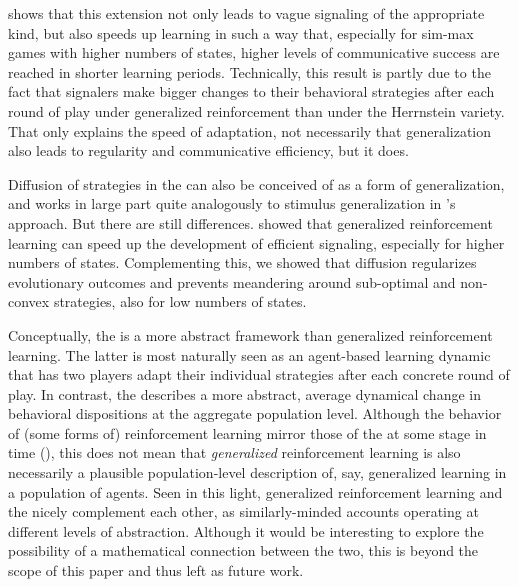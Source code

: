 \documentclass[fleqn,reqno,10pt]{article}
\newcommand{\rd}{\acro{rd}} %
\newcommand{\rdd}{\acro{rdd}} %
\begin{document}
\citet{OConnor2013:The-Evolution-o} shows that this extension not only
leads to vague signaling of the appropriate kind, but also speeds up
learning in such a way that, especially for sim-max games with higher
numbers of states, higher levels of communicative success are reached
in shorter learning periods. Technically, this result is partly due to
the fact that signalers make bigger changes to their behavioral
strategies after each round of play under generalized reinforcement
than under the Herrnstein variety. That only explains the speed of
adaptation, not necessarily that generalization also leads to
regularity and communicative efficiency, but it does.

Diffusion of strategies in the \rdd can also be conceived of as a form
of generalization, and works in large part quite analogously to stimulus
generalization in \citeauthor{OConnor2013:The-Evolution-o}'s
approach. But there are still
differences. \citeauthor{OConnor2013:The-Evolution-o} showed that
generalized reinforcement learning can speed up the development of
efficient signaling, especially for higher numbers of
states. Complementing this, we showed that diffusion regularizes
evolutionary outcomes and prevents meandering around sub-optimal and
non-convex strategies, also for low numbers of states.

Conceptually, the \rdd is a more abstract framework than generalized
reinforcement learning. The latter is most naturally seen as an
agent-based learning dynamic that has two players adapt their
individual strategies after each concrete round of play. In contrast,
the \rdd describes a more abstract, average dynamical change in
behavioral dispositions at the aggregate population level. Although
the behavior of (some forms of) reinforcement learning mirror those of
the \rd at some stage in time
(\cite{BorgersSarin997:Learning-Throug,HopkinsPosch2005:Attainability-o,Beggs2005:On-the-Converge}),
this does not mean that \emph{generalized} reinforcement learning is
also necessarily a plausible population-level description of, say,
generalized learning in a population of agents. Seen in this light,
generalized reinforcement learning and the \rdd nicely complement each
other, as similarly-minded accounts operating at different levels of
abstraction.
Although it would be interesting to explore the possibility of a mathematical connection between the two, this is beyond the scope of this paper and thus left as future work.
\end{document}
